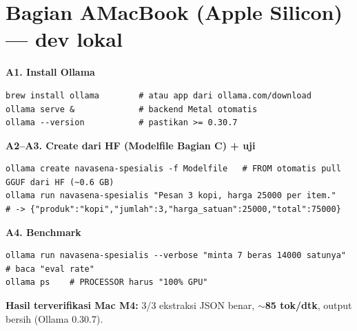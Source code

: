 \documentclass[11pt,a4paper]{article}
\begin{document}
\section*{\color{nvgreen}Bagian A\quad MacBook (Apple Silicon) --- dev lokal}
\textbf{A1. Install Ollama}
\begin{lstlisting}[style=nvsh]
brew install ollama        # atau app dari ollama.com/download
ollama serve &             # backend Metal otomatis
ollama --version           # pastikan >= 0.30.7
\end{lstlisting}
\textbf{A2--A3. Create dari HF (Modelfile Bagian C) + uji}
\begin{lstlisting}[style=nvsh]
ollama create navasena-spesialis -f Modelfile   # FROM otomatis pull GGUF dari HF (~0.6 GB)
ollama run navasena-spesialis "Pesan 3 kopi, harga 25000 per item."
# -> {"produk":"kopi","jumlah":3,"harga_satuan":25000,"total":75000}
\end{lstlisting}
\textbf{A4. Benchmark}
\begin{lstlisting}[style=nvsh]
ollama run navasena-spesialis --verbose "minta 7 beras 14000 satunya"  # baca "eval rate"
ollama ps    # PROCESSOR harus "100% GPU"
\end{lstlisting}
\begin{tip}\textbf{Hasil terverifikasi Mac M4:} 3/3 ekstraksi JSON benar, \textbf{$\sim$85 tok/dtk}, output bersih (Ollama 0.30.7).\end{tip}
\end{document}
